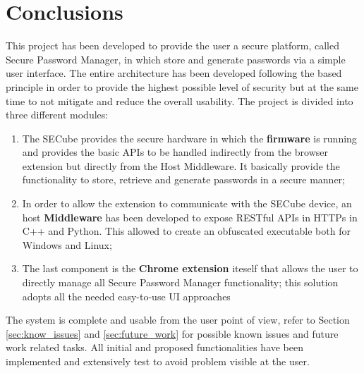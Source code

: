 \chapter{Conclusions}

This project has been developed to provide the user a secure platform, called Secure Password Manager, in which store and generate passwords via a simple user interface. The entire architecture has been developed following the based principle in order to provide the highest possible level of security but at the same time to not mitigate and reduce the overall usability.\newline\newline
The project is divided into three different modules:
\begin{enumerate}
	\item The SECube provides the secure hardware in which the \textbf{firmware} is running and provides the basic APIs to be handled indirectly from the browser extension but directly from the Host Middleware. It basically provide the functionality to store, retrieve and generate passwords in a secure manner;
	\item In order to allow the extension to communicate with the SECube device, an host \textbf{Middleware} has been developed to expose RESTful APIs in HTTPs in C++ and Python. This allowed to create an obfuscated executable both for Windows and Linux;
	\item The last component is the \textbf{Chrome extension} iteself that allows the user to directly manage all Secure Password Manager functionality; this solution adopts all the needed easy-to-use UI approaches
\end{enumerate}
The system is complete and usable from the user point of view, refer to Section \ref{sec:know_issues} and \ref{sec:future_work} for possible known issues and future work related tasks. All initial and proposed functionalities have been implemented and extensively test to avoid problem visible at the user. 


